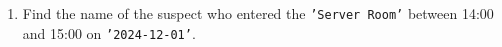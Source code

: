\documentclass[12pt,a4paper]{article}
\begin{document}
\begin{enumerate}
    \item Find the name of the suspect who entered the \texttt{'Server Room'} between 14:00 and 15:00 on \texttt{'2024-12-01'}.


\end{enumerate}
\end{document}
